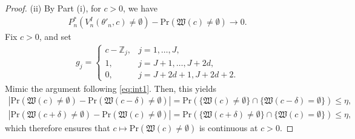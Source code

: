 \documentclass[letterpaper,11pt]{article}
\theoremstyle{myplain}
\theoremstyle{mydefinition}
\theoremstyle{myremark}
\newcommand{\HH}{\mathbb{Z}}
\numberwithin{equation}{section}
\numberwithin{figure}{section}
\begin{document}
\begin{appendices}
\begin{proof}
(ii) 
By Part (i), for $c>0$, we have
\begin{align}
P^*_n(V^I_n(\theta'_n,c)\ne \emptyset)-	\mathrm{Pr}(\mathfrak{W}(c)\ne\emptyset)\to 0.	\label{eq:cv_conv2_1}
\end{align}
Fix $c>0$, and set
 \begin{align}
 g_{j} =\left\{ \begin{array}{lll}
  c - \HH_j, &  j=1,\dots,J,\\
  1, &  j=J+1,\dots,J+2d,\\
 0, & j=J+2d+1,J+2d+2.
 	\end{array} 
 	\right. \label{eq:cv_conv2_2}
 \end{align}
Mimic the argument following \eqref{eq:int1}. Then, this yields
\begin{align}
 \left\vert \mathrm{Pr}\left(\mathfrak{W}(c)\neq \emptyset \right)-\mathrm{Pr}\left(\mathfrak{W}(c-\delta)\neq \emptyset \right)\right\vert = \mathrm{Pr}\left(\{\mathfrak{W}(c)\neq \emptyset\} \cap  \{\mathfrak{W}(c-\delta)=\emptyset\}\right)\le\eta,\label{eq:cv_conv2_3a}\\
 \left\vert \mathrm{Pr}\left(\mathfrak{W}(c+\delta)\neq \emptyset \right)-\mathrm{Pr}\left(\mathfrak{W}(c)\neq \emptyset \right)\right\vert = \mathrm{Pr}\left(\{\mathfrak{W}(c+\delta)\neq \emptyset\} \cap  \{\mathfrak{W}(c)=\emptyset\}\right)\le \eta,\label{eq:cv_conv2_3b}
\end{align}
which therefore ensures that $c\mapsto \mathrm{Pr}(\mathfrak{W}(c)\ne\emptyset)$ is continuous at $c>0$.


\end{proof}
\end{appendices}
\end{document}

